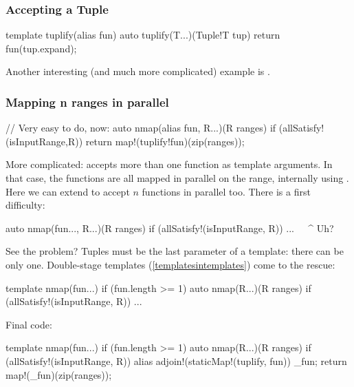 \subsubsection{Accepting a Tuple}


\begin{dcode}
template tuplify(alias fun)
{
    auto tuplify(T...)(Tuple!T tup)
    {
        return fun(tup.expand);
    }
}
\end{dcode}

Another interesting (and much more complicated) example is .

\subsubsection{Mapping n ranges in parallel}\label{parallelmapping}

\begin{dcode}
// Very easy to do, now:
auto nmap(alias fun, R...)(R ranges) if (allSatisfy!(isInputRange,R))
{
    return map!(tuplify!fun)(zip(ranges));
}
\end{dcode}

More complicated:  accepts more than one function as template arguments. In that case, the functions are all mapped in parallel on the range, internally using .
Here we can extend  to accept $n$ functions in parallel too. There is a first difficulty:

\begin{dcode}
auto nmap(fun..., R...)(R ranges) if (allSatisfy!(isInputRange, R))
{ ...  }  ^^^^^^^^^^^^^ Uh?
\end{dcode}

See the problem? Tuples must be the last parameter of a template: there can be only one. Double-stage templates (\autoref{templatesintemplates}) come to the rescue:

\begin{dcode}
template nmap(fun...) if (fun.length >= 1)
{
    auto nmap(R...)(R ranges) if (allSatisfy!(isInputRange, R))
    {...}
}
\end{dcode}

Final code:

\begin{dcode}
template nmap(fun...) if (fun.length >= 1)
{
    auto nmap(R...)(R ranges) if (allSatisfy!(isInputRange, R))
    {
        alias adjoin!(staticMap!(tuplify, fun)) _fun;
        return map!(_fun)(zip(ranges));
    }
}
\end{dcode}

